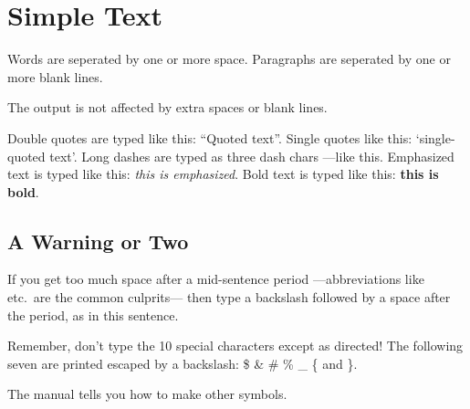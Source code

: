 \documentclass{article}
\begin{document}

\section{Simple Text}  %
Words are seperated by one or more space.  Paragraphs are seperated by
one or more blank lines.

The output is not affected by extra spaces or blank lines.

Double quotes are typed like this: ``Quoted text''.
Single quotes like this: `single-quoted text'.
Long dashes are typed as three dash chars ---like this.
Emphasized text is typed like this: \emph{this is emphasized}.
Bold text is typed like this: \textbf{this is bold}.

\subsection{A Warning or Two}  %
If you get too much space after a mid-sentence period ---abbreviations
like etc.\ are the common culprits--- then type a backslash followed by a 
space after the period, as in this sentence.

Remember, don't type the 10 special characters except as directed!  The 
following seven are printed escaped by a backslash: 
\$ \& \# \% \_ \{ and \}.

The manual tells you how to make other symbols.
\end{document}

